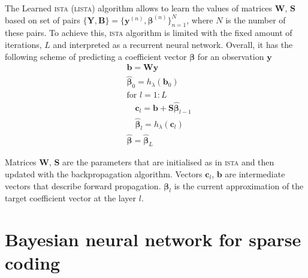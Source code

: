 \documentclass[letterpaper]{article}
\begin{document}
The Learned \textsc{ista} (\textsc{lista}) \citep{gregor2010learning} algorithm allows to learn the values of matrices $\mathbf{W}$, $\mathbf{S}$ based on set of pairs $\{\mathbf{Y}, \mathbf{B}\}=\{\mathbf{y}^{(n)}, \boldsymbol\beta^{(n)}\}_{n=1}^N$, where $N$ is the number of these pairs. To achieve this, \textsc{ista} algorithm is limited with the fixed amount of iterations, $L$ and interpreted as a recurrent neural network. Overall, it has the following scheme of predicting a coefficient vector $\boldsymbol\beta$ for an observation $\mathbf{y}$
\begin{align}
&\mathbf{b} = \mathbf{W}\mathbf{y}\\
&\widehat{\boldsymbol\beta}_0 = h_\lambda(\mathbf{b}_0) \\
&\text{for } l=1:L\\
	&\quad \mathbf{c}_l = \mathbf{b} + \mathbf{S}\widehat{\boldsymbol\beta}_{l-1} \\
	&\quad \widehat{\boldsymbol\beta}_{l} = h_\lambda(\mathbf{c}_l) \\
& \widehat{\boldsymbol\beta} = \widehat{\boldsymbol\beta}_{L}
\end{align}

Matrices $\mathbf{W}$, $\mathbf{S}$ are the parameters that are initialised as in \textsc{ista} and then updated with the backpropagation algorithm. Vectors $\mathbf{c}_l$, $\mathbf{b}$ are intermediate vectors that describe forward propagation. $\boldsymbol\beta_l$ is the current approximation of the target coefficient vector at the layer $l$.

\section{Bayesian neural network for sparse coding}
\label{sec:bayesian_lista}
\end{document}
